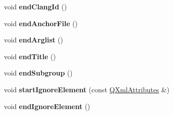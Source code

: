\begin{DoxyCompactItemize}
\item 
\hypertarget{class_tag_file_parser_a3194781848d4fbb1636ff45b7018cdf2}{void {\bfseries end\-Clang\-Id} ()}\label{class_tag_file_parser_a3194781848d4fbb1636ff45b7018cdf2}

\item 
\hypertarget{class_tag_file_parser_a488714fdbdb0c2c415ce0f30b020ba18}{void {\bfseries end\-Anchor\-File} ()}\label{class_tag_file_parser_a488714fdbdb0c2c415ce0f30b020ba18}

\item 
\hypertarget{class_tag_file_parser_aa1586c81c24eaf06f763c611969bf806}{void {\bfseries end\-Arglist} ()}\label{class_tag_file_parser_aa1586c81c24eaf06f763c611969bf806}

\item 
\hypertarget{class_tag_file_parser_a7b02cc485cad21197a018533aa05fe79}{void {\bfseries end\-Title} ()}\label{class_tag_file_parser_a7b02cc485cad21197a018533aa05fe79}

\item 
\hypertarget{class_tag_file_parser_a5ce1aee92c1c84161bd6b8495e253eea}{void {\bfseries end\-Subgroup} ()}\label{class_tag_file_parser_a5ce1aee92c1c84161bd6b8495e253eea}

\item 
\hypertarget{class_tag_file_parser_a60dab34e12b0cd5a0e79c19f8e2665c1}{void {\bfseries start\-Ignore\-Element} (const \hyperlink{class_q_xml_attributes}{Q\-Xml\-Attributes} \&)}\label{class_tag_file_parser_a60dab34e12b0cd5a0e79c19f8e2665c1}

\item 
\hypertarget{class_tag_file_parser_a657eeb3fdb6192171652f64396606718}{void {\bfseries end\-Ignore\-Element} ()}\label{class_tag_file_parser_a657eeb3fdb6192171652f64396606718}


\end{DoxyCompactItemize}
